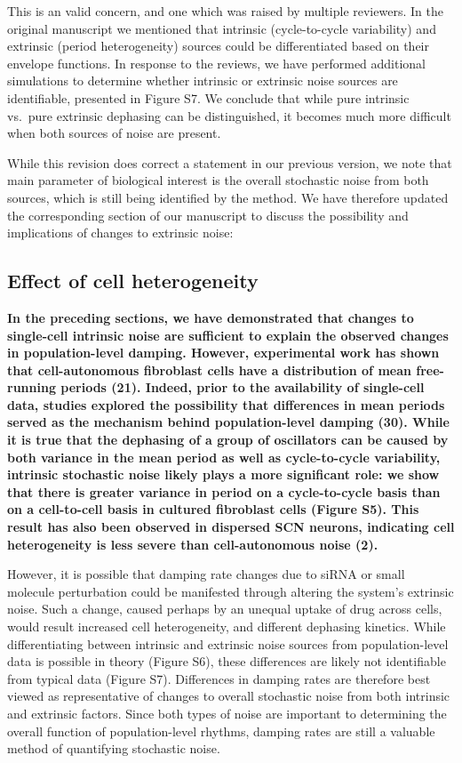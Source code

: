 \documentclass[11pt, letterpaper]{article}
\newenvironment{manuscript}[1]{\begin{center}\begin{tcolorbox}[colback=green!5!white,colframe=green!75!black,width=\textwidth,title={#1},breakable,fonttitle=\bfseries]}{\end{tcolorbox}\end{center}}
\begin{document}
This is an valid concern, and one which was raised by multiple reviewers.
In the original manuscript we mentioned that intrinsic (cycle-to-cycle variability) and extrinsic (period heterogeneity) sources could be differentiated based on their envelope functions.
In response to the reviews, we have performed additional simulations to determine whether intrinsic or extrinsic noise sources are identifiable, presented in Figure S7.
We conclude that while pure intrinsic vs.\ pure extrinsic dephasing can be distinguished, it becomes much more difficult when both sources of noise are present.

While this revision does correct a statement in our previous version, we note that main parameter of biological interest is the overall stochastic noise from both sources, which is still being identified by the method.
We have therefore updated the corresponding section of our manuscript to discuss the possibility and implications of changes to extrinsic noise:

\begin{manuscript}{Page 13}
  \section*{Effect of cell heterogeneity}
  {\bfseries
In the preceding sections, we have demonstrated that changes to single-cell intrinsic noise are sufficient to explain the observed changes in population-level damping. 
However, experimental work has shown that cell-autonomous fibroblast cells have a distribution of mean free-running periods (21). 
Indeed, prior to the availability of single-cell data, studies explored the possibility that differences in mean periods served as the mechanism behind population-level damping (30). 
While it is true that the dephasing of a group of oscillators can be caused by both variance in the mean period as well as cycle-to-cycle variability, intrinsic stochastic noise likely plays a more significant role: we show that there is greater variance in period on a cycle-to-cycle basis than on a cell-to-cell basis in cultured fibroblast cells (Figure S5). 
This result has also been observed in dispersed SCN neurons, indicating cell heterogeneity is less severe than cell-autonomous noise (2).

However, it is possible that damping rate changes due to siRNA or small molecule perturbation could be manifested through altering the system's extrinsic noise. 
Such a change, caused perhaps by an unequal uptake of drug across cells, would result increased cell heterogeneity, and different dephasing kinetics. 
While differentiating between intrinsic and extrinsic noise sources from population-level data is possible in theory (Figure S6), these differences are likely not identifiable from typical data (Figure S7). 
Differences in damping rates are therefore best viewed as representative of changes to overall stochastic noise from both intrinsic and extrinsic factors. 
Since both types of noise are important to determining the overall function of population-level rhythms, damping rates are still a valuable method of quantifying stochastic noise.
}
\end{manuscript}
\end{document}
